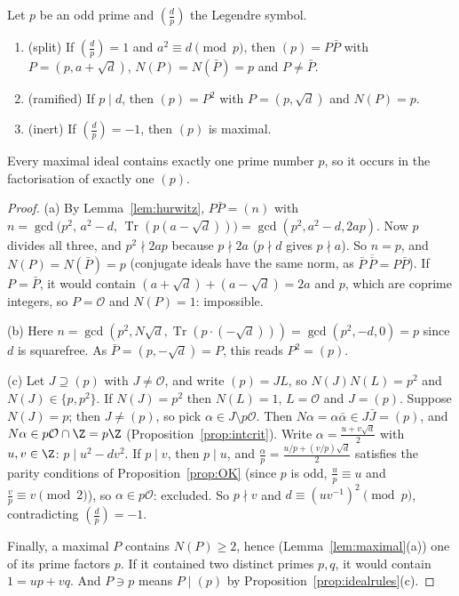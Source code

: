 \begin{theorem}\label{thm:split}
Let $p$ be an odd prime and $\left(\frac dp\right)$ the Legendre symbol.
\begin{enumerate}[label=(\alph*)]
\item (split) If $\left(\frac dp\right)=1$ and $a^2\equiv d\pmod p$, then $(p)=P\bar P$ with $P=(p,a+\sqrt d)$, $N(P)=N(\bar P)=p$ and $P\ne\bar P$.
\item (ramified) If $p\mid d$, then $(p)=P^2$ with $P=(p,\sqrt d)$ and $N(P)=p$.
\item (inert) If $\left(\frac dp\right)=-1$, then $(p)$ is maximal.
\end{enumerate}
Every maximal ideal contains exactly one prime number $p$, so it occurs in the factorisation of exactly one $(p)$.
\end{theorem}
\begin{proof}
(a) By Lemma~\ref{lem:hurwitz}, $P\bar P=(n)$ with $n=\gcd\big(p^2,\,a^2-d,\,\operatorname{Tr}(p(a-\sqrt d))\big)=\gcd(p^2,a^2-d,2ap)$. Now $p$ divides all three, and $p^2\nmid2ap$ because $p\nmid2a$ ($p\nmid d$ gives $p\nmid a$). So $n=p$, and $N(P)=N(\bar P)=p$ (conjugate ideals have the same norm, as $\bar P\,\overline{\bar P}=P\bar P$). If $P=\bar P$, it would contain $(a+\sqrt d)+(a-\sqrt d)=2a$ and $p$, which are coprime integers, so $P=\mathcal O$ and $N(P)=1$: impossible.

(b) Here $n=\gcd(p^2,N\sqrt d,\operatorname{Tr}(p\cdot(-\sqrt d)))=\gcd(p^2,-d,0)=p$ since $d$ is squarefree. As $\bar P=(p,-\sqrt d)=P$, this reads $P^2=(p)$.

(c) Let $J\supseteq(p)$ with $J\ne\mathcal O$, and write $(p)=JL$, so $N(J)N(L)=p^2$ and $N(J)\in\{p,p^2\}$. If $N(J)=p^2$ then $N(L)=1$, $L=\mathcal O$ and $J=(p)$. Suppose $N(J)=p$; then $J\ne(p)$, so pick $\alpha\in J\setminus p\mathcal O$. Then $N\alpha=\alpha\bar\alpha\in J\bar J=(p)$, and $N\alpha\in p\mathcal O\cap\Z=p\Z$ (Proposition~\ref{prop:intcrit}). Write $\alpha=\frac{u+v\sqrt d}2$ with $u,v\in\Z$: $p\mid u^2-dv^2$. If $p\mid v$, then $p\mid u$, and $\frac\alpha p=\frac{u/p+(v/p)\sqrt d}2$ satisfies the parity conditions of Proposition~\ref{prop:OK} (since $p$ is odd, $\frac up\equiv u$ and $\frac vp\equiv v\pmod2$), so $\alpha\in p\mathcal O$: excluded. So $p\nmid v$ and $d\equiv(uv^{-1})^2\pmod p$, contradicting $\left(\frac dp\right)=-1$.

Finally, a maximal $P$ contains $N(P)\ge2$, hence (Lemma~\ref{lem:maximal}(a)) one of its prime factors $p$. If it contained two distinct primes $p,q$, it would contain $1=up+vq$. And $P\ni p$ means $P\mid(p)$ by Proposition~\ref{prop:idealrules}(c).
\end{proof}

